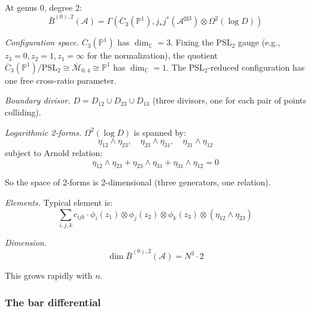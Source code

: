\begin{example}\label{ex:bar-genus0-deg2}
At genus 0, degree 2:
\[\bar{B}^{(0),2}(\mathcal{A}) = \Gamma\left(\overline{C}_3(\mathbb{P}^1), j_*j^*(\mathcal{A}^{\boxtimes 3}) \otimes \Omega^2(\log D)\right)\]

\emph{Configuration space.} $\overline{C}_3(\mathbb{P}^1)$ has $\dim_\mathbb{C} = 3$.  Fixing the $\text{PSL}_2$ gauge (e.g., $z_3 = 0, z_2 = 1, z_1 = \infty$ for the normalization), the quotient $\overline{C}_3(\mathbb{P}^1)/\text{PSL}_2 \cong \overline{\mathcal{M}}_{0,4} \cong \mathbb{P}^1$ has $\dim_\mathbb{C} = 1$.  The $\text{PSL}_2$-reduced configuration has one free cross-ratio parameter.

\emph{Boundary divisor.} $D = D_{12} \cup D_{23} \cup D_{13}$ (three divisors, one for each pair of points colliding).

\emph{Logarithmic 2-forms.} $\Omega^2(\log D)$ is spanned by:
\[\eta_{12} \wedge \eta_{23}, \quad \eta_{23} \wedge \eta_{31}, \quad \eta_{31} \wedge \eta_{12}\]
subject to Arnold relation:
\[\eta_{12} \wedge \eta_{23} + \eta_{23} \wedge \eta_{31} + \eta_{31} \wedge \eta_{12} = 0\]

So the space of 2-forms is 2-dimensional (three generators, one relation).

\emph{Elements.} Typical element is:
\[\sum_{i,j,k} c_{ijk} \cdot \phi_i(z_1) \otimes \phi_j(z_2) \otimes \phi_k(z_3) \otimes (\eta_{12} \wedge \eta_{23})\]

\emph{Dimension.} 
\[\dim \bar{B}^{(0),2}(\mathcal{A}) = N^3 \cdot 2\]

This grows rapidly with $n$.
\end{example}

\subsubsection{The bar differential}

